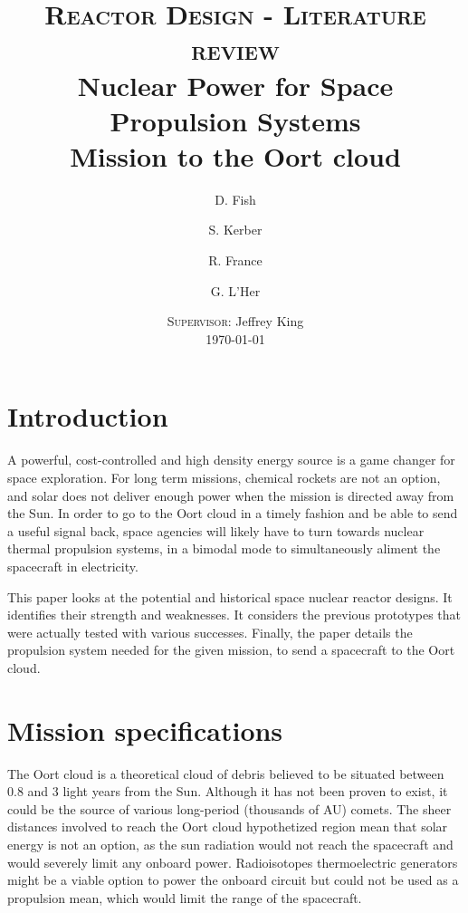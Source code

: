 \documentclass{article}
\title{
\textsc{Reactor Design - Literature review}\\[2.6cm]
{\LARGE \bfseries Nuclear Power for Space Propulsion Systems}\\{\Large\bfseries Mission to the Oort cloud}
}
\author{
D. Fish 
\and 
S. Kerber
\and
R. France
\and
G. L'Her
}
\date{
\textsc{Supervisor:} Jeffrey King\\[1em]
\today
}
\begin{document}
\maketitle
\newpage

\singlespacing
\tableofcontents
\newpage
\listoffigures
\newpage
\doublespacing




\section{Introduction}
\label{sec:intro}
A powerful, cost-controlled and high density energy source is a game changer for space exploration. For long term missions, chemical rockets are not an option, and solar does not deliver enough power when the mission is directed away from the Sun. In order to go to the Oort cloud in a timely fashion and be able to send a useful signal back, space agencies will likely have to turn towards nuclear thermal propulsion systems, in a bimodal mode to simultaneously aliment the spacecraft in electricity.

This paper looks at the potential and historical space nuclear reactor designs. It identifies their strength and weaknesses. It considers the previous prototypes that were actually tested with various successes. Finally, the paper details the propulsion system needed for the given mission, to send a spacecraft to the Oort cloud.

\section{Mission specifications}

The Oort cloud is a theoretical cloud of debris believed to be situated between 0.8 and 3 light years from the Sun. Although it has not been proven to exist, it could be the source of various long-period (thousands of AU) comets. The sheer distances involved to reach the Oort cloud hypothetized region mean that solar energy is not an option, as the sun radiation would not reach the spacecraft and would severely limit any onboard power. Radioisotopes thermoelectric generators might be a viable option to power the onboard circuit but could not be used as a propulsion mean, which would limit the range of the spacecraft.
\end{document}
